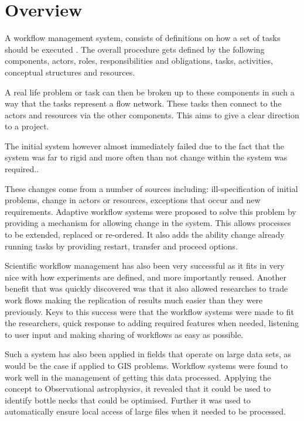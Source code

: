 \documentclass[11pt,twocolumn]{article}
\begin{document}
\section{Overview}
    A workflow management system, consists of definitions
    on how a set of tasks should be executed
    \cite{springerlink:10.1007/BF00136712,vanderAalst2002125}.
    The overall procedure gets defined by the following
    components, actors, roles, responsibilities and
    obligations, tasks, activities, conceptual structures
    and resources.

    A real life problem or task can then be broken up to these
    components in such a way that the tasks represent a flow
    network. These tasks then connect to the actors and resources
    via the other components\cite[p.~4]{Taylor:2006:WES:1196459}.
    This aims to give a clear direction to a project.

    The initial system however almost immediately failed
    due to the fact that the system was far to rigid and
    more often than not change within the system was
    required.\cite{Suchman:1983:OPP:357442.357445}.

    These changes come from a number of sources including:
    ill-specification of initial problems, change in actors
    or resources, exceptions that occur and new requirements.
    Adaptive workflow systems were proposed to solve this
    problem by providing a mechanism for allowing change in
    the system. This allows processes to be extended,
    replaced or re-ordered. It also adds the ability change
    already running tasks by providing restart, transfer and
    proceed options\cite{vanderAalst2002125}.

    Scientific workflow management has also been very
    successful as it fits in very nice with how experiments
    are defined, and more importantly reused. Another
    benefit that was quickly discovered was that it also
    allowed researches to trade work flows making the
    replication of results much easier than they were
    previously. Keys to this success were that the workflow
    systems were made to fit the researchers, quick response
    to adding required features when needed, listening
    to user input and making sharing of workflows as easy as
    possible\cite{4721191}.

    Such a system has also been applied in fields that
    operate on large data sets, as would be the case if
    applied to GIS problems. Workflow systems were found
    to work well in the management of getting this data
    processed. Applying the concept to Observational
    astrophysics, it revealed that it could be used
    to identify bottle necks that could be optimised.
    Further it was used to automatically ensure local
    access of large files when it needed to be processed.
    \cite{Aragon:2009:WMH:1529282.1529491}
\end{document}
